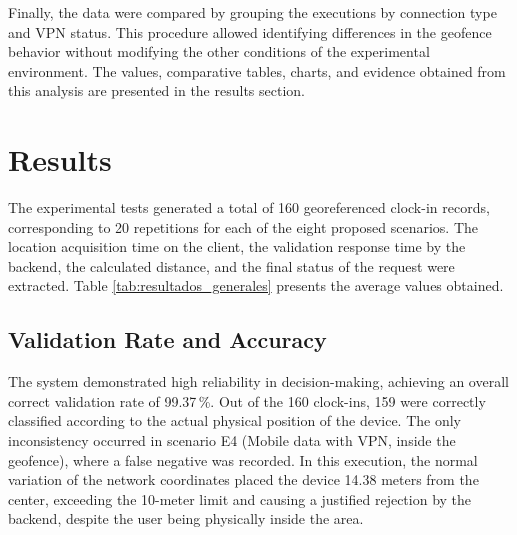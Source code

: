 \documentclass[runningheads]{llncs}
\begin{document}
Finally, the data were compared by grouping the executions by connection type and VPN status. This procedure allowed identifying differences in the geofence behavior without modifying the other conditions of the experimental environment. The values, comparative tables, charts, and evidence obtained from this analysis are presented in the results section.

\section{Results}
The experimental tests generated a total of 160 georeferenced clock-in records, corresponding to 20 repetitions for each of the eight proposed scenarios. The location acquisition time on the client, the validation response time by the backend, the calculated distance, and the final status of the request were extracted. Table \ref{tab:resultados_generales} presents the average values obtained.

\begin{table}[htbp]
\centering
\caption{Average results grouped by connectivity scenario ($N=20$ per scenario).}
\label{tab:resultados_generales}
\renewcommand{\arraystretch}{1.2}
\end{table}
\subsection{Validation Rate and Accuracy}
The system demonstrated high reliability in decision-making, achieving an overall correct validation rate of 99.37\,\%. Out of the 160 clock-ins, 159 were correctly classified according to the actual physical position of the device. The only inconsistency occurred in scenario E4 (Mobile data with VPN, inside the geofence), where a false negative was recorded. In this execution, the normal variation of the network coordinates placed the device 14.38 meters from the center, exceeding the 10-meter limit and causing a justified rejection by the backend, despite the user being physically inside the area.
\end{document}
